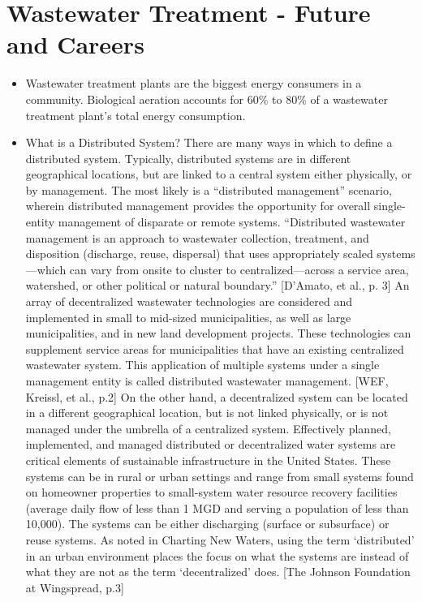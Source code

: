 \chapter{Wastewater Treatment - Future and Careers}
\begin{itemize}

\item Wastewater treatment plants are the biggest energy consumers in a community. Biological aeration accounts for
60\% to 80\% of a wastewater treatment plant’s total energy consumption.

\item What is a Distributed System?
There are many ways in which to define a distributed system. Typically, distributed systems are in different geographical locations, but are linked to a central system either physically, or by management. The most likely is a “distributed management” scenario, wherein distributed management provides the opportunity for overall single-entity management of disparate or remote systems. “Distributed wastewater management is an approach to wastewater collection, treatment, and disposition (discharge, reuse, dispersal) that uses appropriately scaled systems—which can vary from onsite to cluster to centralized—across a service area, watershed, or other political or natural boundary.” [D’Amato, et al., p. 3]
An array of decentralized wastewater technologies are considered and implemented in small to mid-sized municipalities, as well as large municipalities, and in new land development projects. These technologies can supplement service areas for municipalities that have an existing centralized wastewater system. This application of multiple systems under a single management entity is called distributed wastewater management. [WEF, Kreissl, et al., p.2]
On the other hand, a decentralized system can be located in a different geographical location, but is not linked physically, or is not managed under the umbrella of a centralized system.
Effectively planned, implemented, and managed distributed or decentralized water systems are critical elements of sustainable infrastructure in the United States. These systems can be in rural or urban settings and range from small systems found on homeowner properties to small-system water resource recovery facilities (average daily flow of less than 1 MGD and serving a population of less than 10,000). The systems can be either discharging (surface or subsurface) or reuse systems. As noted in Charting New Waters, using the term ‘distributed’ in an urban environment places the focus on what the systems are instead of what they are not as the term ‘decentralized’ does. [The Johnson Foundation at Wingspread, p.3]
\end{itemize}

